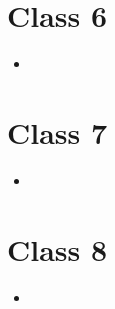 \documentclass[11pt]{article}
\newenvironment{itemise}{
\begin{itemize}
  \setlength{\itemsep}{1pt}
  \setlength{\parskip}{0pt}
  \setlength{\parsep}{0pt}
}{\end{itemize}}
\begin{document}
\section*{Class 6}
\begin{itemise}
\item 
\end{itemise}
\section*{Class 7}
\begin{itemise}
\item 
\end{itemise}
\section*{Class 8}
\begin{itemise}
\item 
\end{itemise}

















%
%
\end{document}
